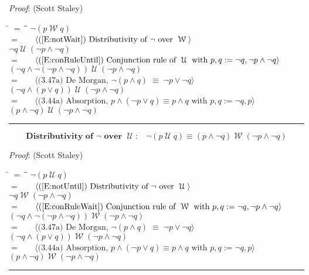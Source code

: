 \documentclass[12pt, fleqn, leqno]{article}
\newcommand{\lgap}{2pt}                             %
\newcommand{\mymathindent}{24pt}                    %
\newcommand{\equivs}{\ensuremath{\;\equiv\;}}       %
\newcommand{\Until}{\;\mathcal{U}\;}
\newcommand{\Wait}{\;\mathcal{W}\;}
\newcommand{\myqed}{\rule[-.23ex]{1.2ex}{2.0ex}}
\newcommand{\myqedtab}{\hspace{384pt}}              %
\newcommand{\Gll} {\langle}                         %
\newcommand{\Ggg} {\rangle}                         %
\newcommand{\Hint}[1]     {\ \ \ $\Gll              \mbox{#1} \Ggg$ }   %
\begin{document}
\emph{Proof}: (Scott Staley)
\begin{tabbing}
\hspace{\mymathindent} \= $= \;$ \= \myqedtab \= \kill
\> \> $\neg (p\Wait q)$\\[\lgap]
\> $=$ \> \Hint{(\ref{E:notWait}) Distributivity of $\neg$ over $\Wait$} \\[\lgap]
\> \> $\neg q \Until (\neg p \land \neg q)$\\[\lgap]
\> $=$ \> \Hint{(\ref{E:conRuleUntil}) Conjunction rule of $\Until$ with $p,q:=\neg q, \neg p\land\neg q$} \\[\lgap]
\> \> $(\neg q \land \neg(\neg p \land \neg q)) \Until (\neg p \land \neg q)$\\[\lgap]
\> $=$  \>  \Hint{(3.47a) De Morgan, $\neg(p\land q)\equivs \neg p\lor\neg q$}\\[\lgap]
\> \> $(\neg q \land (p \lor q)) \Until (\neg p \land \neg q)$\\[\lgap]
\> $=$ \> \Hint{(3.44a) Absorption, $p\land (\neg p\lor q)\equiv p\land q$ with $p,q:=\neg q,p$} \\[\lgap]
\> \> $(p \land \neg q) \Until (\neg p \land \neg q)$ \quad \myqed
\end{tabbing}
\begin{equation}\label{E:notUntil2}
\textbf{Distributivity of $\neg$ over $\Until$:}\quad \neg(p\Until q)\equiv (p\land \neg q)\Wait(\neg p\land \neg q)
\end{equation}

\emph{Proof}: (Scott Staley)
\begin{tabbing}
\hspace{\mymathindent} \= $= \;$ \= \myqedtab \= \kill
\> \> $\neg (p\Until q)$\\[\lgap]
\> $=$ \> \Hint{(\ref{E:notUntil}) Distributivity of $\neg$ over $\Until$} \\[\lgap]
\> \> $\neg q \Wait (\neg p \land \neg q)$\\[\lgap]
\> $=$ \> \Hint{(\ref{E:conRuleWait}) Conjunction rule of $\Wait$ with $p,q:=\neg q, \neg p\land\neg q$} \\[\lgap]
\> \> $(\neg q \land \neg(\neg p \land \neg q)) \Wait (\neg p \land \neg q)$\\[\lgap]
\> $=$  \>  \Hint{(3.47a) De Morgan, $\neg(p\land q)\equivs \neg p\lor\neg q$}\\[\lgap]
\> \> $(\neg q \land (p \lor q)) \Wait (\neg p \land \neg q)$\\[\lgap]
\> $=$ \> \Hint{(3.44a) Absorption, $p\land (\neg p\lor q)\equiv p\land q$ with $p,q:=\neg q,p$} \\[\lgap]
\> \> $(p \land \neg q) \Wait (\neg p \land \neg q)$ \quad \myqed
\end{tabbing}
\end{document}
